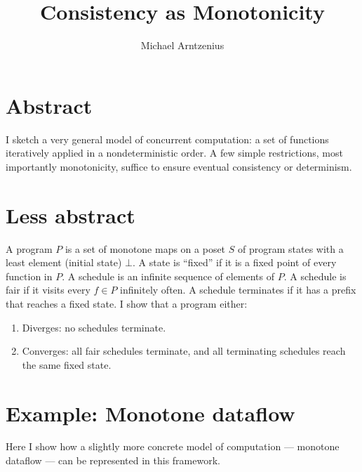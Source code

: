 \documentclass{article}
\newcommand{\todo}[1]{{\color{red}{#1}}}
\begin{document}
\title{Consistency as Monotonicity}
\author{Michael Arntzenius}
\date{}
\maketitle


\section{Abstract}

I sketch a very general model of concurrent computation: a set of functions
iteratively applied in a nondeterministic order. A few simple restrictions, most
importantly monotonicity, suffice to ensure eventual consistency or determinism.


\section{Less abstract}
\label{sec:less-abstract}

A program $P$ is a set of monotone maps on a poset $S$ of program states with a
least element (initial state) $\bot$. A state is ``fixed'' if it is a fixed
point of every function in $P$. A schedule is an infinite sequence of elements
of $P$. A schedule is fair if it visits every $f \in P$ infinitely often. A
schedule terminates if it has a prefix that reaches a fixed state. I \todo{hope
  to} show that a program either:

\begin{enumerate}
\item Diverges: no schedules terminate.
\item Converges: all fair schedules terminate, and all terminating schedules
  reach the same fixed state.
\end{enumerate}

\todo{TODO: REWRITE: Well, this is false! All fair schedules do not necessarily
  terminate! However, all terminating schedules DO reach the same fixed state.}

\todo{nwf mentions that the question of whether a ``random'' schedule finds a
  reachable fixed point (assuming one exists) with probability 1 reminds him of
  Markov mixing time.}


\section{Example: Monotone dataflow}

Here I show how a slightly more concrete model of computation --- monotone
dataflow --- can be represented in this framework.
\end{document}

